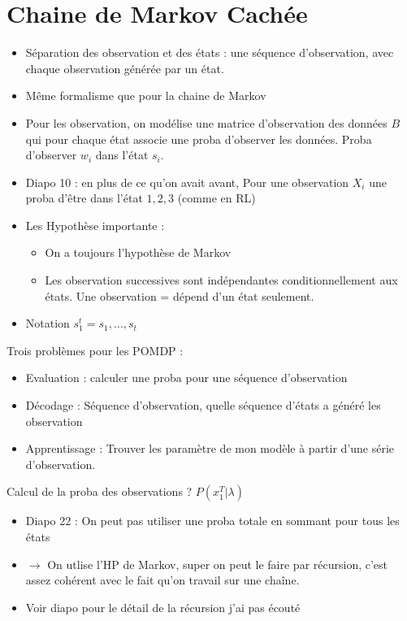 \documentclass{article}
\theoremstyle{plain}%
\theoremstyle{definition}
\theoremstyle{remark}
\begin{document}
\section{Chaine de Markov Cachée}
\begin{itemize}
    \item Séparation des observation et des états : une séquence d'observation, avec chaque observation générée par un état.
    \item Même formalisme que pour la chaine de Markov
    \item Pour les observation, on modélise une matrice d'observation des données $ B $ qui pour chaque état associe une proba d'observer les données. Proba d'observer $ w_i $ dans l'état $ s_i $.
    \item Diapo 10 : en plus de ce qu'on avait avant, Pour une observation $ X_i $ une proba d'être dans l'état $ 1, 2, 3 $ (comme en RL)
    \item Les Hypothèse importante : \begin{itemize}
        \item On a toujours l'hypothèse de Markov 
        \item Les observation successives sont indépendantes conditionnellement aux états. Une observation = dépend d'un état seulement.
    \end{itemize}
    \item Notation $ s^t_1 = s_1, \dots, s_t $ 
\end{itemize}
Trois problèmes pour les POMDP : 
\begin{itemize}
    \item Evaluation : calculer une proba pour une séquence d'observation 
    \item Décodage : Séquence d'observation, quelle séquence d'états a généré les observation
    \item Apprentissage : Trouver les paramètre de mon modèle à partir d'une série d'observation. 
\end{itemize}
Calcul de la proba des observations ? $ P(x_1^T | \lambda ) $ 
\begin{itemize}
    \item Diapo 22 : On peut pas utiliser une proba totale en sommant pour tous les états
    \item $\rightarrow$ On utlise l'HP de Markov, super on peut le faire par récursion, c'est assez cohérent avec le fait qu'on travail sur une chaîne.
    \item Voir diapo pour le détail de la récursion j'ai pas écouté
\end{itemize}
\end{document}
